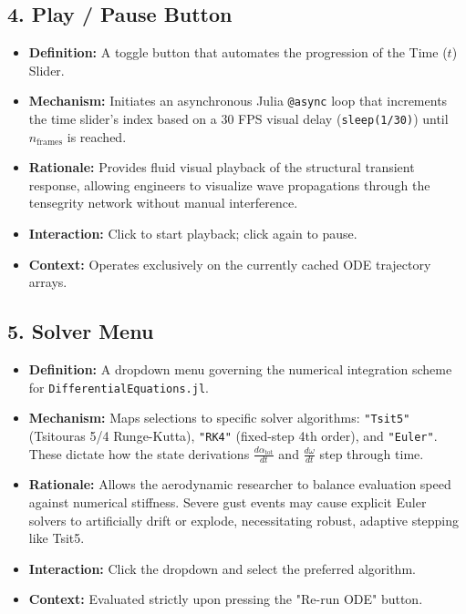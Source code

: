 \documentclass[11pt,a4paper]{article}
\begin{document}
\subsection{4. Play / Pause Button}
\begin{itemize}
    \item \textbf{Definition:} A toggle button that automates the progression of the Time ($t$) Slider.
    \item \textbf{Mechanism:} Initiates an asynchronous Julia \texttt{@async} loop that increments the time slider's index based on a $30$ FPS visual delay (\texttt{sleep(1/30)}) until $n_{\text{frames}}$ is reached.
    \item \textbf{Rationale:} Provides fluid visual playback of the structural transient response, allowing engineers to visualize wave propagations through the tensegrity network without manual interference.
    \item \textbf{Interaction:} Click to start playback; click again to pause.
    \item \textbf{Context:} Operates exclusively on the currently cached ODE trajectory arrays.
\end{itemize}

\subsection{5. Solver Menu}
\begin{itemize}
    \item \textbf{Definition:} A dropdown menu governing the numerical integration scheme for \texttt{DifferentialEquations.jl}.
    \item \textbf{Mechanism:} Maps selections to specific solver algorithms: \texttt{"Tsit5"} (Tsitouras 5/4 Runge-Kutta), \texttt{"RK4"} (fixed-step 4th order), and \texttt{"Euler"}. These dictate how the state derivations $\frac{d\alpha_{\text{tot}}}{dt}$ and $\frac{d\omega}{dt}$ step through time.
    \item \textbf{Rationale:} Allows the aerodynamic researcher to balance evaluation speed against numerical stiffness. Severe gust events may cause explicit Euler solvers to artificially drift or explode, necessitating robust, adaptive stepping like Tsit5.
    \item \textbf{Interaction:} Click the dropdown and select the preferred algorithm.
    \item \textbf{Context:} Evaluated strictly upon pressing the "Re-run ODE" button.
\end{itemize}
\end{document}
